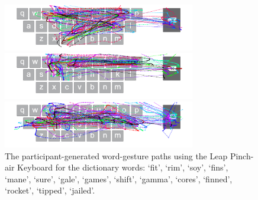 \begin{figure}[t]
	\begin{minipage}[t]{8in}
	\hspace{-20pt}
	\begin{minipage}[t]{3.1in}
		\includegraphics[width=3.3in]{Figures/fig_rocket_paths}
	\end{minipage}
	\begin{minipage}[t]{3in}
		\includegraphics[width=3.3in]{Figures/fig_tipped_paths}
	\end{minipage}
	\end{minipage}
	
	\begin{minipage}[t]{8in}
	\hspace{-20pt}
	\begin{minipage}[t]{3.1in}
		\includegraphics[width=3.3in]{Figures/fig_jailed_paths}
	\end{minipage}
	\end{minipage}
	\caption[User Generated Paths for the Leap Pinch-air Keyboard]{The participant-generated word-gesture paths using the Leap Pinch-air Keyboard for the dictionary words: `fit', `rim', `soy', `fins', `mane', `sure', `gale', `games', `shift', `gamma', `cores', `finned', `rocket', `tipped', `jailed'.}
\end{figure}